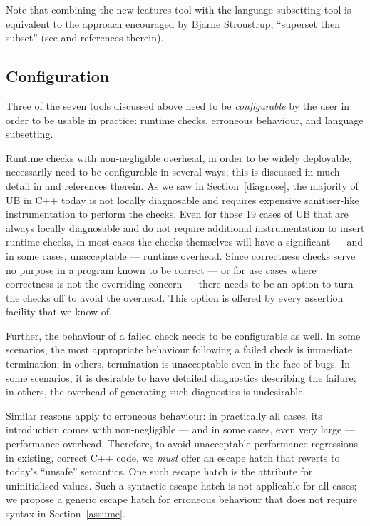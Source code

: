 {Note that combining the new features tool with the language subsetting tool is equivalent to the approach encouraged by Bjarne Stroustrup, ``superset then subset'' (see \cite{P3650R0} and references therein).

\subsection{Configuration}
\label{config}

Three of the seven tools discussed above need to be \emph{configurable} by the user in order to be usable in practice: runtime checks, erroneous behaviour, and language subsetting.

Runtime checks with non-negligible overhead, in order to be widely deployable, necessarily need to be configurable in several ways; this is discussed in much detail in \cite{P2899R1} and references therein. As we saw in Section~\ref{diagnose}, the majority of UB in C++ today is not locally diagnosable and requires expensive sanitiser-like instrumentation to perform the checks. Even for those 19 cases of UB that are always locally diagnosable and do not require additional instrumentation to insert runtime checks, in most cases the checks themselves will have a significant --- and in some cases, unacceptable --- runtime overhead. Since correctness checks serve no purpose in a program known to be correct --- or for use cases where correctness is not the overriding concern ---  there needs to be an option to turn the checks off to avoid the overhead. This option is offered by every assertion facility that we know of. 

Further, the behaviour of a failed check needs to be configurable as well. In some scenarios, the most appropriate behaviour following a failed check is immediate termination; in others, termination is unacceptable even in the face of bugs. In some scenarios, it is desirable to have detailed diagnostics describing the failure; in others, the overhead of generating such diagnostics is undesirable.

Similar reasons apply to erroneous behaviour: in practically all cases, its introduction comes with non-negligible --- and in some cases, even very large --- performance overhead. Therefore, to avoid unacceptable performance regressions in existing, correct C++ code, we \emph{must} offer an escape hatch that reverts to today's ``unsafe'' semantics. One such escape hatch is the \tcode{[[indeterminate]]} attribute for uninitialised values. Such a syntactic escape hatch is not applicable for all cases; we propose a generic escape hatch for erroneous behaviour that does not require syntax in  Section~\ref{assume}.

}
